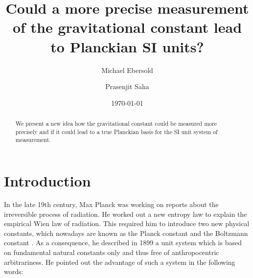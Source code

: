 \documentclass[prb,preprint]{revtex4-1}
\begin{document}

\title{Could a more precise measurement of the gravitational constant lead to Planckian SI units?}

\author{Michael Ebersold}
\author{Prasenjit Saha}


\date{\today}

\begin{abstract}
We present a new idea how the gravitational constant could be measured more precisely and if it could lead to a true Planckian basis for the SI unit system of measurement.
\end{abstract}

\maketitle %


\section{Introduction} %

In the late 19th century, Max Planck was working on reports about the irreversible process of radiation. He worked out a new entropy law to explain the empirical Wien law of radiation. This required him to introduce two new physical constants, which nowadays are known as the Planck constant and the Boltzmann constant \cite{Tomilin1999}. As a consequence, he described in 1899 a unit system which is based on fundamental natural constants only and thus free of anthropocentric arbitrariness. He pointed out the advantage of such a system in the following words:\cite{Planck99}\\
\end{document}
